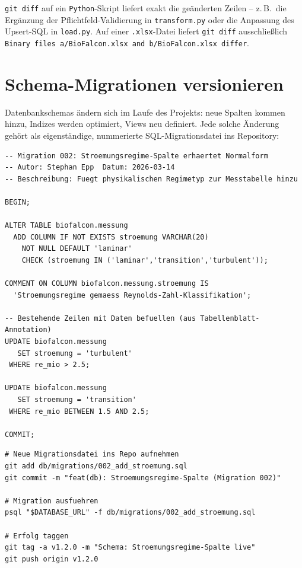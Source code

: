 ﻿\documentclass[12pt,a4paper]{report}
\theoremstyle{definition}
\theoremstyle{remark}
\newcommand{\py}{\texttt{Python}}
\newcommand{\code}[1]{\texttt{#1}}
\begin{document}
\code{git diff} auf ein \py-Skript liefert exakt die geänderten Zeilen --
z.\,B.\ die Ergänzung der Pflichtfeld-Validierung in \code{transform.py}
oder die Anpassung des Upsert-SQL in \code{load.py}. Auf einer
\code{.xlsx}-Datei liefert \code{git diff} ausschließlich
\code{Binary files a/BioFalcon.xlsx and b/BioFalcon.xlsx differ}.

\section{Schema-Migrationen versionieren}

Datenbankschemas ändern sich im Laufe des Projekts: neue Spalten kommen
hinzu, Indizes werden optimiert, Views neu definiert.
Jede solche Änderung gehört als eigenständige, nummerierte
SQL-Migrationsdatei ins Repository:

\begin{lstlisting}[style=sql, caption={db/migrations/002\_add\_stroemung.sql}]
-- Migration 002: Stroemungsregime-Spalte erhaertet Normalform
-- Autor: Stephan Epp  Datum: 2026-03-14
-- Beschreibung: Fuegt physikalischen Regimetyp zur Messtabelle hinzu

BEGIN;

ALTER TABLE biofalcon.messung
  ADD COLUMN IF NOT EXISTS stroemung VARCHAR(20)
    NOT NULL DEFAULT 'laminar'
    CHECK (stroemung IN ('laminar','transition','turbulent'));

COMMENT ON COLUMN biofalcon.messung.stroemung IS
  'Stroemungsregime gemaess Reynolds-Zahl-Klassifikation';

-- Bestehende Zeilen mit Daten befuellen (aus Tabellenblatt-Annotation)
UPDATE biofalcon.messung
   SET stroemung = 'turbulent'
 WHERE re_mio > 2.5;

UPDATE biofalcon.messung
   SET stroemung = 'transition'
 WHERE re_mio BETWEEN 1.5 AND 2.5;

COMMIT;
\end{lstlisting}

\begin{lstlisting}[style=bash, caption={Migrationsdatei committen und deployen}]
# Neue Migrationsdatei ins Repo aufnehmen
git add db/migrations/002_add_stroemung.sql
git commit -m "feat(db): Stroemungsregime-Spalte (Migration 002)"

# Migration ausfuehren
psql "$DATABASE_URL" -f db/migrations/002_add_stroemung.sql

# Erfolg taggen
git tag -a v1.2.0 -m "Schema: Stroemungsregime-Spalte live"
git push origin v1.2.0
\end{lstlisting}
\end{document}
